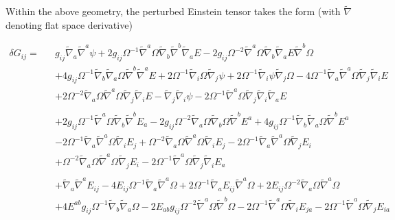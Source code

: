 \documentclass[10pt,letterpaper]{article}
\numberwithin{equation}{section}
\begin{document}
Within the above geometry, the perturbed Einstein tensor takes the form (with $\tilde \nabla$ denoting flat space derivative)

\begin{eqnarray}
\delta G_{ij}=&&g_{ij} \tilde{\nabla}_{a}\tilde{\nabla}^{a}\psi
 + 2 g_{ij} \Omega^{-1} \tilde{\nabla}^{a}\Omega \tilde{\nabla}_{b}\tilde{\nabla}^{b}\tilde{\nabla}_{a}E
 - 2 g_{ij} \Omega^{-2} \tilde{\nabla}^{a}\Omega \tilde{\nabla}_{b}\tilde{\nabla}_{a}E \tilde{\nabla}^{b}\Omega\nonumber\\
&& + 4 g_{ij} \Omega^{-1} \tilde{\nabla}_{b}\tilde{\nabla}_{a}\Omega \tilde{\nabla}^{b}\tilde{\nabla}^{a}E
 + 2 \Omega^{-1} \tilde{\nabla}_{i}\Omega \tilde{\nabla}_{j}\psi
 + 2 \Omega^{-1} \tilde{\nabla}_{i}\psi \tilde{\nabla}_{j}\Omega
 - 4 \Omega^{-1} \tilde{\nabla}_{a}\tilde{\nabla}^{a}\Omega \tilde{\nabla}_{j}\tilde{\nabla}_{i}E
\nonumber\\
&& + 2 \Omega^{-2} \tilde{\nabla}_{a}\Omega \tilde{\nabla}^{a}\Omega \tilde{\nabla}_{j}\tilde{\nabla}_{i}E
 -  \tilde{\nabla}_{j}\tilde{\nabla}_{i}\psi
 - 2 \Omega^{-1} \tilde{\nabla}^{a}\Omega \tilde{\nabla}_{j}\tilde{\nabla}_{i}\tilde{\nabla}_{a}E
\nonumber\\ \nonumber\\
&& +2 g_{ij} \Omega^{-1} \tilde{\nabla}^{a}\Omega \tilde{\nabla}_{b}\tilde{\nabla}^{b}E_{a}
 - 2 g_{ij} \Omega^{-2} \tilde{\nabla}_{a}\Omega \tilde{\nabla}_{b}\Omega \tilde{\nabla}^{b}E^{a}
 + 4 g_{ij} \Omega^{-1} \tilde{\nabla}_{b}\tilde{\nabla}_{a}\Omega \tilde{\nabla}^{b}E^{a}
\nonumber\\
&& - 2 \Omega^{-1} \tilde{\nabla}_{a}\tilde{\nabla}^{a}\Omega \tilde{\nabla}_{i}E_{j}
 + \Omega^{-2} \tilde{\nabla}_{a}\Omega \tilde{\nabla}^{a}\Omega \tilde{\nabla}_{i}E_{j}
 - 2 \Omega^{-1} \tilde{\nabla}_{a}\tilde{\nabla}^{a}\Omega \tilde{\nabla}_{j}E_{i}
\nonumber\\
&& + \Omega^{-2} \tilde{\nabla}_{a}\Omega \tilde{\nabla}^{a}\Omega \tilde{\nabla}_{j}E_{i}
 - 2 \Omega^{-1} \tilde{\nabla}^{a}\Omega \tilde{\nabla}_{j}\tilde{\nabla}_{i}E_{a}
\nonumber \\ \nonumber\\
&&+\tilde{\nabla}_{a}\tilde{\nabla}^{a}E_{ij}
 - 4 E_{ij} \Omega^{-1} \tilde{\nabla}_{a}\tilde{\nabla}^{a}\Omega
 + 2 \Omega^{-1} \tilde{\nabla}_{a}E_{ij} \tilde{\nabla}^{a}\Omega
 + 2 E_{ij} \Omega^{-2} \tilde{\nabla}_{a}\Omega \tilde{\nabla}^{a}\Omega\nonumber\\
&& + 4 E^{ab} g_{ij} \Omega^{-1} \tilde{\nabla}_{b}\tilde{\nabla}_{a}\Omega
 - 2 E_{ab} g_{ij} \Omega^{-2} \tilde{\nabla}^{a}\Omega \tilde{\nabla}^{b}\Omega
 - 2 \Omega^{-1} \tilde{\nabla}^{a}\Omega \tilde{\nabla}_{i}E_{ja}
 - 2 \Omega^{-1} \tilde{\nabla}^{a}\Omega \tilde{\nabla}_{j}E_{ia}
\end{eqnarray}
\end{document}
